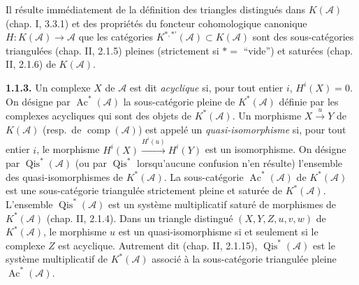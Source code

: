 \clearpage
{}%
\begingroup\small\setlength{\parskip}{0pt}\setlength{\emergencystretch}{1.5em}
\setlength{\abovedisplayskip}{4pt plus 2pt minus 2pt}%
\setlength{\belowdisplayskip}{4pt plus 2pt minus 2pt}%

Il résulte immédiatement de la définition des triangles distingués dans
$K(\mathcal A)$ (chap. I, 3.3.1) et des propriétés du foncteur cohomologique
canonique $H\colon K(\mathcal A)\longrightarrow\mathcal A$ que les
catégories $K^{*,*'}(\mathcal A)\subset K(\mathcal A)$ sont des
sous-catégories triangulées (chap. II, 2.1.5) pleines (strictement si
$*={}$ ``vide'') et saturées (chap. II, 2.1.6) de $K(\mathcal A)$.

\medskip\noindent\textbf{1.1.3.}\quad
Un complexe $X$ de $\mathcal A$ est dit \emph{acyclique} si, pour tout entier
$i$, $H^i(X)=0$. On désigne par $\operatorname{Ac}^{*}(\mathcal A)$ la
sous-catégorie pleine de $K^{*}(\mathcal A)$ définie par les complexes
acycliques qui sont des objets de $K^{*}(\mathcal A)$. Un morphisme
$X\xrightarrow{u}Y$ de $K(\mathcal A)$ (resp.\ de
$\operatorname{comp}(\mathcal A)$) est appelé un \emph{quasi-isomorphisme}
si, pour tout entier $i$, le morphisme
$H^i(X)\xrightarrow{H^i(u)}H^i(Y)$ est un isomorphisme. On désigne par
$\operatorname{Qis}^{*}(\mathcal A)$ (ou par $\operatorname{Qis}^{*}$
lorsqu'aucune confusion n'en résulte) l'ensemble des quasi-isomorphismes de
$K^{*}(\mathcal A)$. La sous-catégorie
$\operatorname{Ac}^{*}(\mathcal A)$ de $K^{*}(\mathcal A)$ est une
sous-catégorie triangulée strictement pleine et saturée de
$K^{*}(\mathcal A)$. L'ensemble $\operatorname{Qis}^{*}(\mathcal A)$ est un
système multiplicatif saturé de morphismes de $K^{*}(\mathcal A)$
(chap. II, 2.1.4). Dans un triangle distingué $(X,Y,Z,u,v,w)$ de
$K^{*}(\mathcal A)$, le morphisme $u$ est un quasi-isomorphisme si et
seulement si le complexe $Z$ est acyclique. Autrement dit (chap. II,
2.1.15), $\operatorname{Qis}^{*}(\mathcal A)$ est le système multiplicatif
de $K^{*}(\mathcal A)$ associé à la sous-catégorie triangulée pleine
$\operatorname{Ac}^{*}(\mathcal A)$.

